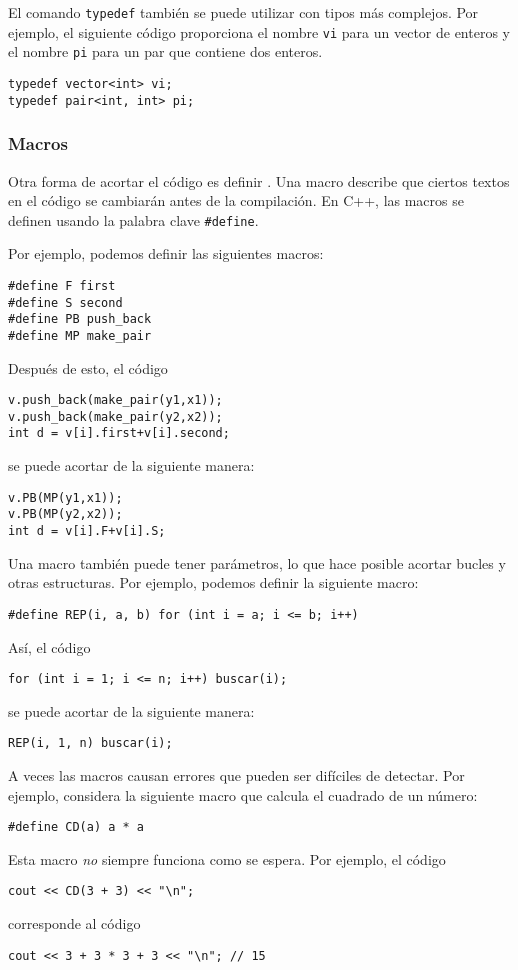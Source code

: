 El comando \texttt{typedef}
también se puede utilizar con tipos más complejos.
Por ejemplo, el siguiente código proporciona
el nombre \texttt{vi} para un vector de enteros
y el nombre \texttt{pi} para un par
que contiene dos enteros.
\begin{lstlisting}
typedef vector<int> vi;
typedef pair<int, int> pi;
\end{lstlisting}

\subsubsection{Macros}
Otra forma de acortar el código es definir
.
Una macro describe que ciertos textos en
el código se cambiarán antes de la compilación.
En C++, las macros se definen usando la
palabra clave \texttt{\#define}.

Por ejemplo, podemos definir las siguientes macros:
\begin{lstlisting}
#define F first
#define S second
#define PB push_back
#define MP make_pair
\end{lstlisting}
Después de esto, el código
\begin{lstlisting}
v.push_back(make_pair(y1,x1));
v.push_back(make_pair(y2,x2));
int d = v[i].first+v[i].second;
\end{lstlisting}
se puede acortar de la siguiente manera:
\begin{lstlisting}
v.PB(MP(y1,x1));
v.PB(MP(y2,x2));
int d = v[i].F+v[i].S;
\end{lstlisting}

Una macro también puede tener parámetros,
lo que hace posible acortar bucles y otras
estructuras.
Por ejemplo, podemos definir la siguiente macro:
\begin{lstlisting}
#define REP(i, a, b) for (int i = a; i <= b; i++)
\end{lstlisting}

\newpage
Así, el código
\begin{lstlisting}
for (int i = 1; i <= n; i++) buscar(i);
\end{lstlisting}
se puede acortar de la siguiente manera:
\begin{lstlisting}
REP(i, 1, n) buscar(i);
\end{lstlisting}

A veces las macros causan errores que pueden ser difíciles
de detectar. Por ejemplo, considera la siguiente macro
que calcula el cuadrado de un número:
\begin{lstlisting}
#define CD(a) a * a
\end{lstlisting}
Esta macro \emph{no} siempre funciona como se espera.
Por ejemplo, el código
\begin{lstlisting}
cout << CD(3 + 3) << "\n";
\end{lstlisting}
corresponde al código
\begin{lstlisting}
cout << 3 + 3 * 3 + 3 << "\n"; // 15
\end{lstlisting}

